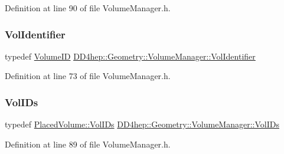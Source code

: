 Definition at line 90 of file Volume\+Manager.\+h.

\hypertarget{class_d_d4hep_1_1_geometry_1_1_volume_manager_a934cf07a47c6c2d9932aef080f789da8}{}\label{class_d_d4hep_1_1_geometry_1_1_volume_manager_a934cf07a47c6c2d9932aef080f789da8} 
\subsubsection{\texorpdfstring{Vol\+Identifier}{VolIdentifier}}
{\footnotesize\ttfamily typedef \hyperlink{class_d_d4hep_1_1_geometry_1_1_volume_manager_ab1f746b561c93be38bc7c6e66fc8ca8a}{Volume\+ID} \hyperlink{class_d_d4hep_1_1_geometry_1_1_volume_manager_a934cf07a47c6c2d9932aef080f789da8}{D\+D4hep\+::\+Geometry\+::\+Volume\+Manager\+::\+Vol\+Identifier}}



Definition at line 73 of file Volume\+Manager.\+h.

\hypertarget{class_d_d4hep_1_1_geometry_1_1_volume_manager_a38763d6e830cf8e61ddd89d5416656eb}{}\label{class_d_d4hep_1_1_geometry_1_1_volume_manager_a38763d6e830cf8e61ddd89d5416656eb} 
\subsubsection{\texorpdfstring{Vol\+I\+Ds}{VolIDs}}
{\footnotesize\ttfamily typedef \hyperlink{class_d_d4hep_1_1_geometry_1_1_placed_volume_a4383991fbc94adc2997ef98c9d30d9a6}{Placed\+Volume\+::\+Vol\+I\+Ds} \hyperlink{class_d_d4hep_1_1_geometry_1_1_volume_manager_a38763d6e830cf8e61ddd89d5416656eb}{D\+D4hep\+::\+Geometry\+::\+Volume\+Manager\+::\+Vol\+I\+Ds}}



Definition at line 89 of file Volume\+Manager.\+h.

\hypertarget{class_d_d4hep_1_1_geometry_1_1_volume_manager_ab1f746b561c93be38bc7c6e66fc8ca8a}{}\label{class_d_d4hep_1_1_geometry_1_1_volume_manager_ab1f746b561c93be38bc7c6e66fc8ca8a} 
